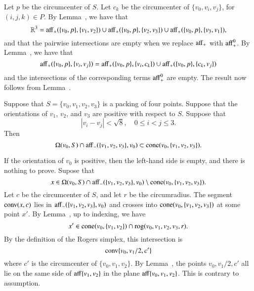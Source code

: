 \begin{tarskidata}
\begin{tarski}
\begin{proved} Let $p$ be the circumcenter of $S$.  Let $c_k$
be the circumcenter of $\{v_0,v_i,v_j\}$, for $(i,j,k)\in P$.
By Lemma~, we have that
   $$
   \mathbb{R}^3 = {\operatorname{aff}}_+(\{v_0,p\},\{v_1,v_2\}) \cup
     {\operatorname{aff}}_+(\{v_0,p\},\{v_2,v_3\}) \cup
     {\operatorname{aff}}_+(\{v_0,p\},\{v_3,v_1\}),
   $$
and that the pairwise intersections are empty when we replace
${\operatorname{aff}}_+$ with ${\operatorname{aff}}_+^0$.  By Lemma~,
we have that 
  $$
  {\operatorname{aff}}_+(\{v_0,p\},\{v_i,v_j\}) =
{\operatorname{aff}}_+(\{v_0,p\},\{v_i,c_k\}) \cup
{\operatorname{aff}}_+(\{v_0,p\},\{c_k,v_j\})
  $$
and the intersections of the corresponding terms ${\operatorname{aff}}_+^0$ 
are empty.
The result now follows from Lemma~.
\swallowed\end{proved}
\end{tarski}





\begin{tarski}

\begin{lemma}
Suppose that $S=\{v_0,v_1,v_2,v_3\}$ is a packing
of four points.  Suppose that
the orientations of $v_1$, $v_2$, and $v_3$ are positive with respect
to $S$.  Suppose that
  $$
  |v_i - v_j | < \sqrt8, \quad 0\le i < j \le 3.
  $$
Then
  $$
  \Omega(v_0,S) \cap {\operatorname{aff}}_-(\{v_1,v_2,v_3\},v_0) \subset
  {\operatorname{cone}}(v_0,\{v_1,v_2,v_3\}).
  $$
\end{lemma}




\begin{proved}  If the orientation of $v_0$ is positive,
then the left-hand side is empty, and there is nothing to prove.
Supose that 
 $$x\in
   \Omega(v_0,S) \cap {\operatorname{aff}}_-(\{v_1,v_2,v_3\},v_0)
   \setminus
  {\operatorname{cone}}(v_0,\{v_1,v_2,v_3\}).
 $$
Let $c$ be the circumcenter of $S$, and let $r$ be the
circumradius.  The segment ${\operatorname{conv}}(x,c)$
lies in ${\operatorname{aff}}_-(\{v_1,v_2,v_3\},v_0)$ and crosses into
${\operatorname{cone}}(v_0,\{v_1,v_2,v_3\})$ at some point $x'$.  
By Lemma~, up to indexing,
we have 
  $$x'\in{\operatorname{cone}}(v_0,\{v_1,v_2\})\cap{\operatorname{rog}}(v_0,v_1,v_2,v_3,r).$$
By the definition of the Rogers simplex, this intersection is
  $${\operatorname{conv}}\{v_0,v_1/2,c'\}$$
where $c'$ is the circumcenter of $\{v_0,v_1,v_2\}$.
By Lemma~, the points $v_0,v_1/2,c'$ all lie
on the same side of ${\operatorname{aff}}\{v_1,v_2\}$ in the plane ${\operatorname{aff}}\{v_0,v_1,v_2\}$.  This is contrary to assumption.
\swallowed\end{proved}
\end{tarski}




\end{tarskidata}
